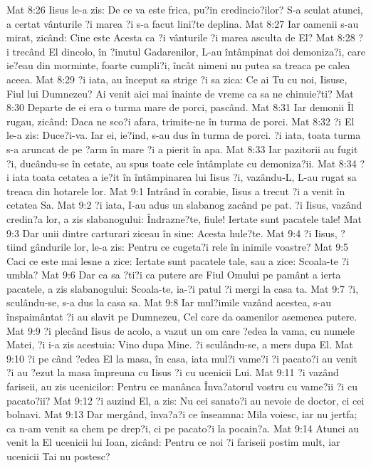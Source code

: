 Mat 8:26  Iisus le-a zis: De ce va este frica, pu?in credincio?ilor? S-a sculat atunci, a certat vânturile ?i marea ?i s-a facut lini?te deplina.
Mat 8:27  Iar oamenii s-au mirat, zicând: Cine este Acesta ca ?i vânturile ?i marea asculta de El?
Mat 8:28  ?i trecând El dincolo, în ?inutul Gadarenilor, L-au întâmpinat doi demoniza?i, care ie?eau din morminte, foarte cumpli?i, încât nimeni nu putea sa treaca pe calea aceea.
Mat 8:29  ?i iata, au început sa strige ?i sa zica: Ce ai Tu cu noi, Iisuse, Fiul lui Dumnezeu? Ai venit aici mai înainte de vreme ca sa ne chinuie?ti?
Mat 8:30  Departe de ei era o turma mare de porci, pascând.
Mat 8:31  Iar demonii Îl rugau, zicând: Daca ne sco?i afara, trimite-ne în turma de porci.
Mat 8:32  ?i El le-a zis: Duce?i-va. Iar ei, ie?ind, s-au dus în turma de porci. ?i iata, toata turma s-a aruncat de pe ?arm în mare ?i a pierit în apa.
Mat 8:33  Iar pazitorii au fugit ?i, ducându-se în cetate, au spus toate cele întâmplate cu demoniza?ii.
Mat 8:34  ?i iata toata cetatea a ie?it în întâmpinarea lui Iisus ?i, vazându-L, L-au rugat sa treaca din hotarele lor.
Mat 9:1  Intrând în corabie, Iisus a trecut ?i a venit în cetatea Sa.
Mat 9:2  ?i iata, I-au adus un slabanog zacând pe pat. ?i Iisus, vazând credin?a lor, a zis slabanogului: Îndrazne?te, fiule! Iertate sunt pacatele tale!
Mat 9:3  Dar unii dintre carturari ziceau în sine: Acesta hule?te.
Mat 9:4  ?i Iisus, ?tiind gândurile lor, le-a zis: Pentru ce cugeta?i rele în inimile voastre?
Mat 9:5  Caci ce este mai lesne a zice: Iertate sunt pacatele tale, sau a zice: Scoala-te ?i umbla?
Mat 9:6  Dar ca sa ?ti?i ca putere are Fiul Omului pe pamânt a ierta pacatele, a zis slabanogului: Scoala-te, ia-?i patul ?i mergi la casa ta.
Mat 9:7  ?i, sculându-se, s-a dus la casa sa.
Mat 9:8  Iar mul?imile vazând acestea, s-au înspaimântat ?i au slavit pe Dumnezeu, Cel care da oamenilor asemenea putere.
Mat 9:9  ?i plecând Iisus de acolo, a vazut un om care ?edea la vama, cu numele Matei, ?i i-a zis acestuia: Vino dupa Mine. ?i sculându-se, a mers dupa El.
Mat 9:10  ?i pe când ?edea El la masa, în casa, iata mul?i vame?i ?i pacato?i au venit ?i au ?ezut la masa împreuna cu Iisus ?i cu ucenicii Lui.
Mat 9:11  ?i vazând fariseii, au zis ucenicilor: Pentru ce manânca Înva?atorul vostru cu vame?ii ?i cu pacato?ii?
Mat 9:12  ?i auzind El, a zis: Nu cei sanato?i au nevoie de doctor, ci cei bolnavi.
Mat 9:13  Dar mergând, înva?a?i ce înseamna: Mila voiesc, iar nu jertfa; ca n-am venit sa chem pe drep?i, ci pe pacato?i la pocain?a.
Mat 9:14  Atunci au venit la El ucenicii lui Ioan, zicând: Pentru ce noi ?i fariseii postim mult, iar ucenicii Tai nu postesc?
